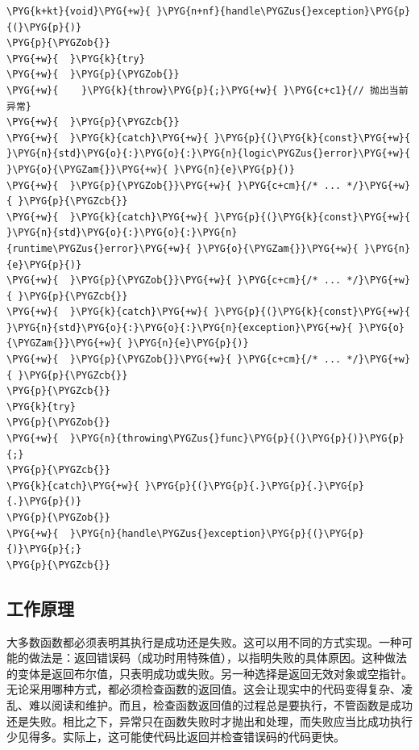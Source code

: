 \begin{itemize}
\begin{codeblockbg}
\begin{Verbatim}[commandchars=\\\{\},breaklines=true,breakanywhere=true,fontsize=\codefont,xleftmargin=17bp]
\PYG{k+kt}{void}\PYG{+w}{ }\PYG{n+nf}{handle\PYGZus{}exception}\PYG{p}{(}\PYG{p}{)}
\PYG{p}{\PYGZob{}}
\PYG{+w}{  }\PYG{k}{try}
\PYG{+w}{  }\PYG{p}{\PYGZob{}}
\PYG{+w}{    }\PYG{k}{throw}\PYG{p}{;}\PYG{+w}{ }\PYG{c+c1}{// 抛出当前异常}
\PYG{+w}{  }\PYG{p}{\PYGZcb{}}
\PYG{+w}{  }\PYG{k}{catch}\PYG{+w}{ }\PYG{p}{(}\PYG{k}{const}\PYG{+w}{ }\PYG{n}{std}\PYG{o}{:}\PYG{o}{:}\PYG{n}{logic\PYGZus{}error}\PYG{+w}{ }\PYG{o}{\PYGZam{}}\PYG{+w}{ }\PYG{n}{e}\PYG{p}{)}
\PYG{+w}{  }\PYG{p}{\PYGZob{}}\PYG{+w}{ }\PYG{c+cm}{/* ... */}\PYG{+w}{ }\PYG{p}{\PYGZcb{}}
\PYG{+w}{  }\PYG{k}{catch}\PYG{+w}{ }\PYG{p}{(}\PYG{k}{const}\PYG{+w}{ }\PYG{n}{std}\PYG{o}{:}\PYG{o}{:}\PYG{n}{runtime\PYGZus{}error}\PYG{+w}{ }\PYG{o}{\PYGZam{}}\PYG{+w}{ }\PYG{n}{e}\PYG{p}{)}
\PYG{+w}{  }\PYG{p}{\PYGZob{}}\PYG{+w}{ }\PYG{c+cm}{/* ... */}\PYG{+w}{ }\PYG{p}{\PYGZcb{}}
\PYG{+w}{  }\PYG{k}{catch}\PYG{+w}{ }\PYG{p}{(}\PYG{k}{const}\PYG{+w}{ }\PYG{n}{std}\PYG{o}{:}\PYG{o}{:}\PYG{n}{exception}\PYG{+w}{ }\PYG{o}{\PYGZam{}}\PYG{+w}{ }\PYG{n}{e}\PYG{p}{)}
\PYG{+w}{  }\PYG{p}{\PYGZob{}}\PYG{+w}{ }\PYG{c+cm}{/* ... */}\PYG{+w}{ }\PYG{p}{\PYGZcb{}}
\PYG{p}{\PYGZcb{}}
\PYG{k}{try}
\PYG{p}{\PYGZob{}}
\PYG{+w}{  }\PYG{n}{throwing\PYGZus{}func}\PYG{p}{(}\PYG{p}{)}\PYG{p}{;}
\PYG{p}{\PYGZcb{}}
\PYG{k}{catch}\PYG{+w}{ }\PYG{p}{(}\PYG{p}{.}\PYG{p}{.}\PYG{p}{.}\PYG{p}{)}
\PYG{p}{\PYGZob{}}
\PYG{+w}{  }\PYG{n}{handle\PYGZus{}exception}\PYG{p}{(}\PYG{p}{)}\PYG{p}{;}
\PYG{p}{\PYGZcb{}}
\end{Verbatim}
\end{codeblockbg}

\end{itemize}



\subsection{工作原理}



大多数函数都必须表明其执行是成功还是失败。这可以用不同的方式实现。一种可能的做法是：返回错误码（成功时用特殊值），以指明失败的具体原因。这种做法的变体是返回布尔值，只表明成功或失败。另一种选择是返回无效对象或空指针。无论采用哪种方式，都必须检查函数的返回值。这会让现实中的代码变得复杂、凌乱、难以阅读和维护。而且，检查函数返回值的过程总是要执行，不管函数是成功还是失败。相比之下，异常只在函数失败时才抛出和处理，而失败应当比成功执行少见得多。实际上，这可能使代码比返回并检查错误码的代码更快。


